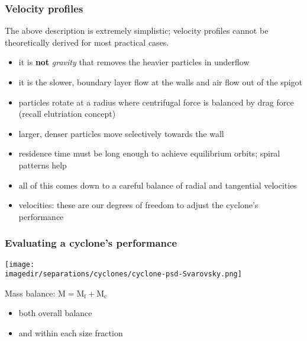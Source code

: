 \begin{frame}\frametitle{Velocity profiles}
	\begin{exampleblock}{}
		The above description is extremely simplistic; velocity profiles cannot be theoretically derived for most practical cases.
	\end{exampleblock}

	\begin{itemize}
		\item	it is \textbf{not} \emph{gravity} that removes the heavier particles in underflow
		\item	it is the slower, boundary layer flow at the walls and air flow out of the spigot
		\item	particles rotate at a radius where centrifugal force is balanced by drag force (recall {\color{purple}elutriation} concept)
		\item	larger, denser particles move selectively towards the wall
		\item	residence time must be long enough to achieve equilibrium orbits; spiral patterns help
		\item	all of this comes down to a careful balance of radial and tangential velocities
		\item	velocities: these are our degrees of freedom to adjust the cyclone's performance
	\end{itemize}
\end{frame}

\begin{frame}\frametitle{Evaluating a cyclone's performance}
	\begin{center}
		\texttt{[image: \\imagedir/separations/cyclones/cyclone-psd-Svarovsky.png]}
	\end{center}

	\vspace{-64pt}
	Mass balance: $\text{M} = \text{M}_\text{f} + \text{M}_\text{c}$
	\begin{itemize}
		\item	both overall balance
		\item	and within each size fraction
	\end{itemize}
	
	\vfill
\end{frame}

